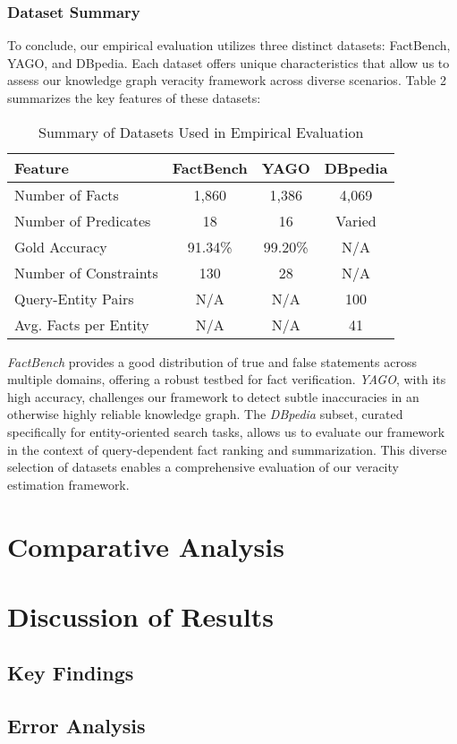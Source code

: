 \subsubsection{Dataset Summary}\label{subsubsec:empirical-evaluation:dataset-analysis:dbpedia:summary}
To conclude, our empirical evaluation utilizes three distinct datasets: FactBench, YAGO, and DBpedia. Each dataset offers unique characteristics that allow us to assess our knowledge graph veracity framework across diverse scenarios. Table 2 summarizes the key features of these datasets:

\begin{table}[h!]
    \centering
    \begin{tabular}{lccc}
        \toprule
        \textbf{Feature} & \textbf{FactBench} & \textbf{YAGO} & \textbf{DBpedia} \\
        \midrule
        Number of Facts & 1,860 & 1,386 & 4,069 \\
        Number of Predicates & 18 & 16 & Varied \\
        Gold Accuracy & 91.34\% & 99.20\% & N/A \\
        Number of Constraints & 130 & 28 & N/A \\
        Query-Entity Pairs & N/A & N/A & 100 \\
        Avg. Facts per Entity & N/A & N/A & 41 \\
        \bottomrule
    \end{tabular}
    \caption{Summary of Datasets Used in Empirical Evaluation}
    \label{tab:dataset-summary}
\end{table}

\textit{FactBench} provides a good distribution of true and false statements across multiple domains, offering a robust testbed for fact verification.
\textit{YAGO}, with its high accuracy, challenges our framework to detect subtle inaccuracies in an otherwise highly reliable knowledge graph.
The \textit{DBpedia} subset, curated specifically for entity-oriented search tasks, allows us to evaluate our framework in the context of query-dependent fact ranking and summarization.
This diverse selection of datasets enables a comprehensive evaluation of our veracity estimation framework.

\section{Comparative Analysis}\label{sec:empirical-evaluation:comparative-analysis}

\section{Discussion of Results}\label{sec:empirical-evaluation:discussion-of-results}
\subsection{Key Findings}\label{subsec:empirical-evaluation:discussion-of-results:key-findings}
\subsection{Error Analysis}\label{subsec:empirical-evaluation:discussion-of-results:error-analysis}
